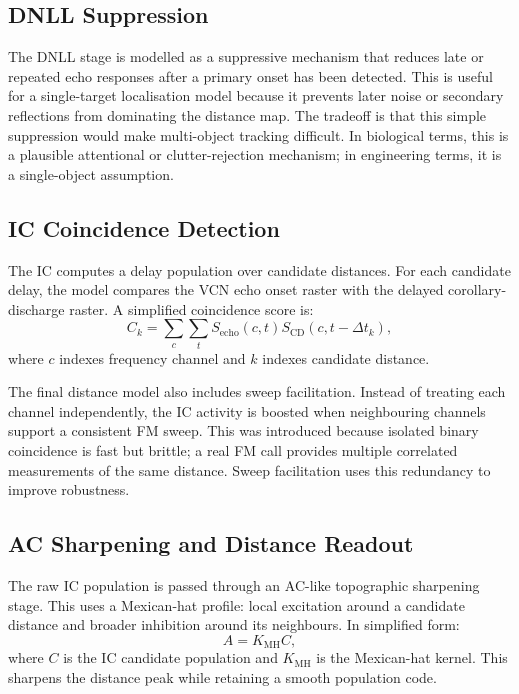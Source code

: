 \subsection{DNLL Suppression}

The DNLL stage is modelled as a suppressive mechanism that reduces late or repeated echo responses after a primary onset has been detected. This is useful for a single-target localisation model because it prevents later noise or secondary reflections from dominating the distance map. The tradeoff is that this simple suppression would make multi-object tracking difficult. In biological terms, this is a plausible attentional or clutter-rejection mechanism; in engineering terms, it is a single-object assumption.

\subsection{IC Coincidence Detection}

The IC computes a delay population over candidate distances. For each candidate delay, the model compares the VCN echo onset raster with the delayed corollary-discharge raster. A simplified coincidence score is:
\begin{equation}
    C_k = \sum_c \sum_t S_{\text{echo}}(c,t)S_{\text{CD}}(c,t-\Delta t_k),
\end{equation}
where $c$ indexes frequency channel and $k$ indexes candidate distance.

The final distance model also includes sweep facilitation. Instead of treating each channel independently, the IC activity is boosted when neighbouring channels support a consistent FM sweep. This was introduced because isolated binary coincidence is fast but brittle; a real FM call provides multiple correlated measurements of the same distance. Sweep facilitation uses this redundancy to improve robustness.

\subsection{AC Sharpening and Distance Readout}

The raw IC population is passed through an AC-like topographic sharpening stage. This uses a Mexican-hat profile: local excitation around a candidate distance and broader inhibition around its neighbours. In simplified form:
\begin{equation}
    A = K_{\text{MH}} C,
\end{equation}
where $C$ is the IC candidate population and $K_{\text{MH}}$ is the Mexican-hat kernel. This sharpens the distance peak while retaining a smooth population code.

